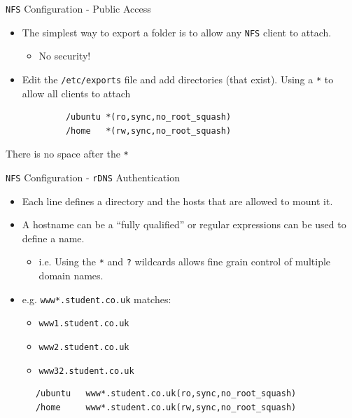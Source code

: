 \documentclass[xcolor=table]{beamer}
\begin{document}
\begin{frame}[fragile]{\texttt{NFS} Configuration - Public Access}
  \begin{itemize}
    \item The simplest way to export a folder is to allow any \texttt{NFS} client to attach.
      \begin{itemize}
        \item No security!
      \end{itemize}
    \item Edit the \texttt{/etc/exports} file and add directories (that exist). Using a \texttt{*} to allow all clients to attach
  \end{itemize}
  \begin{tcolorbox}
    \lstset{
      basicstyle=\tiny\ttfamily,
    }
    \begin{lstlisting}
            /ubuntu	*(ro,sync,no_root_squash)
            /home 	*(rw,sync,no_root_squash)
    \end{lstlisting}
  \end{tcolorbox}
  \begin{tcolorbox}[title={\textbf{IMPORTANT}}]
    \begin{center}
      There is no space after the \texttt{*}
    \end{center}
  \end{tcolorbox}

\end{frame}

\begin{frame}[fragile]{\texttt{NFS} Configuration - \texttt{rDNS} Authentication}
  \begin{itemize}
    \item Each line defines a directory and the hosts that are allowed to mount it. 
    \item A hostname can be a ``fully qualified'' or regular expressions can be used to define a name.
      \begin{itemize}
        \item i.e. Using the \texttt{*} and \texttt{?} wildcards allows fine grain control of multiple domain names.
      \end{itemize}
    \item e.g. \texttt{www*.student.co.uk} matches:
      \begin{itemize}
        \item \texttt{www1.student.co.uk}
        \item \texttt{www2.student.co.uk}
        \item \texttt{www32.student.co.uk}
      \end{itemize}
  \end{itemize}
  \begin{tcolorbox}
    \lstset{
      basicstyle=\tiny\ttfamily,
    }
    \begin{lstlisting}
      /ubuntu	www*.student.co.uk(ro,sync,no_root_squash)
      /home 	www*.student.co.uk(rw,sync,no_root_squash)
    \end{lstlisting}
  \end{tcolorbox}
\end{frame}
\end{document}
